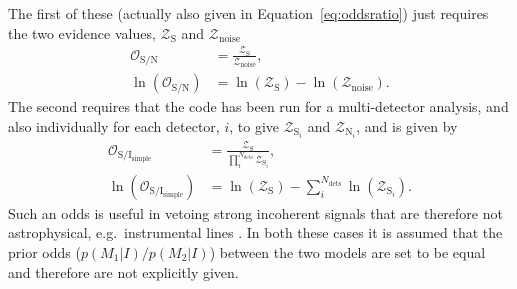 The first of these (actually also given in Equation~\ref{eq:oddsratio}) just requires the two evidence values, $\mathcal{Z}_{\text{S}}$ and $\mathcal{Z}_{\text{noise}}$
\begin{align}\label{eq:sigvsnoise}
 \mathcal{O}_{\text{S}/\text{N}} &= \frac{\mathcal{Z}_{\text{S}}}{\mathcal{Z}_{\text{noise}}}, \nonumber \\
 \ln{\left(\mathcal{O}_{\text{S}/\text{N}}\right)} &= \ln{\left(\mathcal{Z}_{\text{S}}\right)} - \ln{\left({\mathcal{Z}_{\text{noise}}}\right)}.
\end{align}
The second requires that the code has been run for a multi-detector analysis, and also individually for each detector, $i$, to give $\mathcal{Z}_{\text{S}_i}$
and $\mathcal{Z}_{\text{N}_i}$, and is given by
\begin{align}\label{eq:cohvincoh1}
 \mathcal{O}_{\text{S}/\text{I}_{\text{simple}}} &= \frac{\mathcal{Z}_{\text{S}}}{\prod_i^{N_{\text{dets}}} \mathcal{Z}_{\text{S}_i}}, \nonumber \\
 \ln{\left(\mathcal{O}_{\text{S}/\text{I}_{\text{simple}}}\right)} &= \ln{\left(\mathcal{Z}_{\text{S}}\right)} - \sum_i^{N_{\text{dets}}}\ln{\left(\mathcal{Z}_{\text{S}_i}\right)}.
\end{align}
Such an odds is useful in vetoing strong incoherent signals that are therefore not astrophysical, e.g.\ instrumental lines \citep[see, e.g., the similar
line-robust statistic defined in][]{2014PhRvD..89f4023K}. In both these cases it is assumed
that the prior odds ($p(M_1|I)/p(M_2|I)$) between the two models are set to be equal and therefore are not explicitly given.

